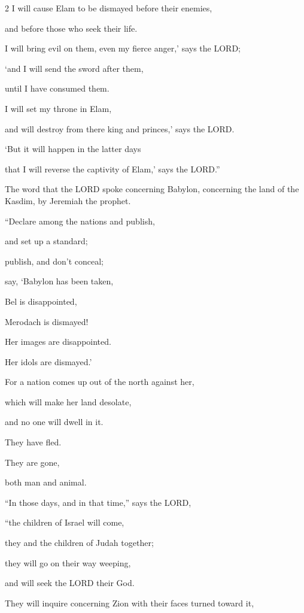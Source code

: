 \begin{multicols}{2}
\myverse{}I will cause Elam to be dismayed before their enemies,

and before those who seek their life.

I will bring evil on them, even my fierce anger,’ says the LORD;

‘and I will send the sword after them,

until I have consumed them.


\myverse{}I will set my throne in Elam,

and will destroy from there king and princes,’ says the LORD.


\myverse{}‘But it will happen in the latter days

that I will reverse the captivity of Elam,’ says the LORD.”


\mychapter{} \myverse*{}The word that the LORD spoke concerning Babylon, concerning the
land of the Kasdim, by Jeremiah the prophet.


\myverse{}“Declare among the nations and publish,

and set up a standard;

publish, and don’t conceal;

say, ‘Babylon has been taken,

Bel is disappointed,

Merodach is dismayed!

Her images are disappointed.

Her idols are dismayed.’


\myverse{}For a nation comes up out of the north against her,

which will make her land desolate,

and no one will dwell in it.

They have fled.

They are gone,

both man and animal.

\vspace{\baselineskip}

\myverse{}“In those days, and in that time,” says the LORD,

“the children of Israel will come,

they and the children of Judah together;

they will go on their way weeping,

and will seek the LORD their God.


\myverse{}They will inquire concerning Zion with their faces turned toward
it,


\end{multicols}
